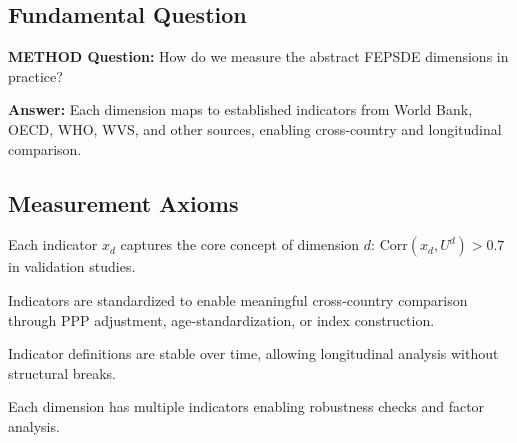 
\subsection{Fundamental Question}

\begin{tcolorbox}[colback=purple!5!white, colframe=purple!75!black]
\textbf{METHOD Question:} How do we measure the abstract FEPSDE dimensions
in practice?

\textbf{Answer:} Each dimension maps to established indicators from World Bank,
OECD, WHO, WVS, and other sources, enabling cross-country and longitudinal
comparison.
\end{tcolorbox}


\subsection{Measurement Axioms}
\label{sec:E-axioms}

\begin{axiom}
\label{ax:E-A1}
Each indicator $x_d$ captures the core concept of dimension $d$:
$\text{Corr}(x_d, U^d) > 0.7$ in validation studies.
\end{axiom}

\begin{axiom}
\label{ax:E-A2}
Indicators are standardized to enable meaningful cross-country comparison
through PPP adjustment, age-standardization, or index construction.
\end{axiom}

\begin{axiom}
\label{ax:E-A3}
Indicator definitions are stable over time, allowing longitudinal analysis
without structural breaks.
\end{axiom}

\begin{axiom}
\label{ax:E-A4}
Each dimension has multiple indicators enabling robustness checks and
factor analysis.
\end{axiom}

